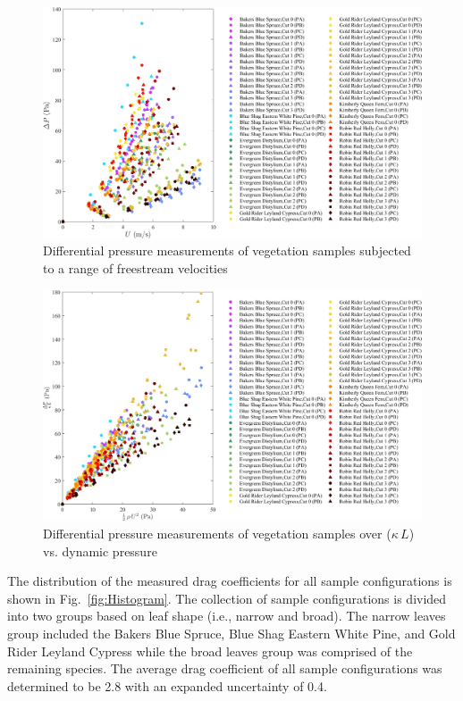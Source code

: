 \documentclass[12pt]{article}
\begin{document}
\begin{figure} [!]
	\centering
	\includegraphics[width=\textwidth,keepaspectratio]{Picture8.jpg}
	\caption[Differential pressure measurements of vegetation samples]{Differential pressure measurements of vegetation samples subjected to a range of freestream velocities}
	\label{fig:DPvU(Overall)}
\end{figure}

\begin{figure}
	\centering
	\includegraphics[width=\textwidth,keepaspectratio]{Picture9.jpg}
	\caption{Differential pressure measurements of vegetation samples over ($\kappa \, L$) vs. dynamic pressure}
	\label{fig:DPoveraf(Overall)}
\end{figure}

The distribution of the measured drag coefficients for all sample configurations is shown in Fig.~\ref{fig:Histogram}. The collection of sample configurations is divided into two groups based on leaf shape (i.e., narrow and broad). The narrow leaves group included the Bakers Blue Spruce, Blue Shag Eastern White Pine, and Gold Rider Leyland Cypress while the broad leaves group was comprised of the remaining species. The average drag coefficient of all sample configurations was determined to be 2.8 with an expanded uncertainty of 0.4. 
\end{document}

